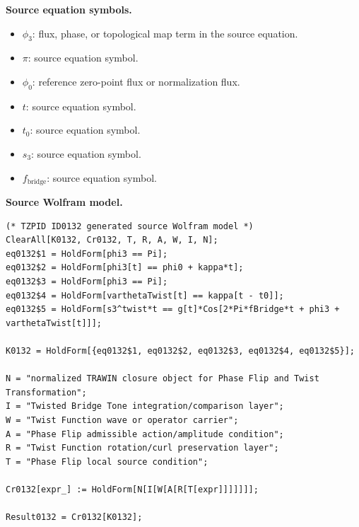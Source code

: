 \begin{minipage}[t]{0.49\linewidth}
\begingroup
\small
\raggedright
\textbf{Source equation symbols.}\par
\begin{itemize}[leftmargin=1.35em,itemsep=1pt,topsep=1pt,parsep=0pt]
    \item $\phi_3$: flux, phase, or topological map term in the source equation.
    \item $\pi$: source equation symbol.
    \item $\phi_0$: reference zero-point flux or normalization flux.
    \item $t$: source equation symbol.
    \item $t_0$: source equation symbol.
    \item $s_3$: source equation symbol.
    \item $f_{\mathrm{bridge}}$: source equation symbol.
\end{itemize}
\endgroup
\end{minipage}\hfill
\begin{minipage}[t]{0.47\linewidth}
\begingroup
\scriptsize
\raggedright
\textbf{Source Wolfram model.}\par
\begin{Verbatim}[fontsize=\tiny,breaklines=true,breakanywhere=true]
(* TZPID ID0132 generated source Wolfram model *)
ClearAll[K0132, Cr0132, T, R, A, W, I, N];
eq0132$1 = HoldForm[phi3 == Pi];
eq0132$2 = HoldForm[phi3[t] == phi0 + kappa*t];
eq0132$3 = HoldForm[phi3 == Pi];
eq0132$4 = HoldForm[varthetaTwist[t] == kappa[t - t0]];
eq0132$5 = HoldForm[s3^twist*t == g[t]*Cos[2*Pi*fBridge*t + phi3 + varthetaTwist[t]]];

K0132 = HoldForm[{eq0132$1, eq0132$2, eq0132$3, eq0132$4, eq0132$5}];

N = "normalized TRAWIN closure object for Phase Flip and Twist Transformation";
I = "Twisted Bridge Tone integration/comparison layer";
W = "Twist Function wave or operator carrier";
A = "Phase Flip admissible action/amplitude condition";
R = "Twist Function rotation/curl preservation layer";
T = "Phase Flip local source condition";

Cr0132[expr_] := HoldForm[N[I[W[A[R[T[expr]]]]]]];

Result0132 = Cr0132[K0132];
\end{Verbatim}
\endgroup
\end{minipage}

